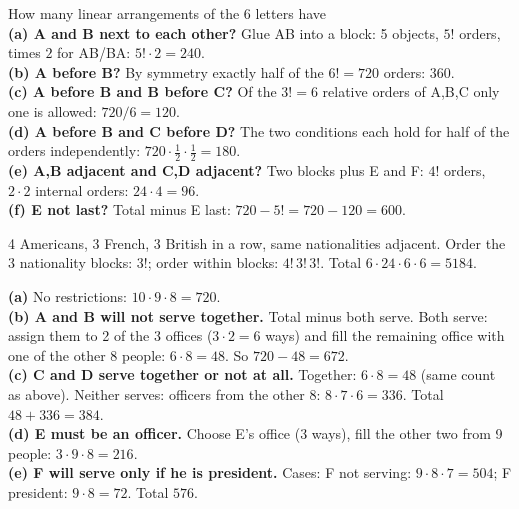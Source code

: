 \documentclass[11pt]{article}
\begin{document}
\begin{exbox}[1.1 Arrangements of A, B, C, D, E, F]
How many linear arrangements of the 6 letters have\\
\textbf{(a) A and B next to each other?} Glue AB into a block: 5 objects, $5!$ orders, times $2$ for AB/BA: $5!\cdot2=\boxed{240}$.\\
\textbf{(b) A before B?} By symmetry exactly half of the $6!=720$ orders: $\boxed{360}$.\\
\textbf{(c) A before B and B before C?} Of the $3!=6$ relative orders of A,B,C only one is allowed: $720/6=\boxed{120}$.\\
\textbf{(d) A before B and C before D?} The two conditions each hold for half of the orders independently: $720\cdot\tfrac12\cdot\tfrac12=\boxed{180}$.\\
\textbf{(e) A,B adjacent and C,D adjacent?} Two blocks plus E and F: $4!$ orders, $2\cdot2$ internal orders: $24\cdot4=\boxed{96}$.\\
\textbf{(f) E not last?} Total minus E last: $720-5!=720-120=\boxed{600}$.
\end{exbox}

\begin{exbox}
4 Americans, 3 French, 3 British in a row, same nationalities adjacent. Order the 3 nationality blocks: $3!$; order within blocks: $4!\,3!\,3!$. Total $6\cdot24\cdot6\cdot6=\boxed{5184}$.
\end{exbox}

\begin{exbox}
\textbf{(a)} No restrictions: $10\cdot9\cdot8=\boxed{720}$.\\
\textbf{(b) A and B will not serve together.} Total minus both serve. Both serve: assign them to 2 of the 3 offices ($3\cdot2=6$ ways) and fill the remaining office with one of the other 8 people: $6\cdot8=48$. So $720-48=\boxed{672}$.\\
\textbf{(c) C and D serve together or not at all.} Together: $6\cdot8=48$ (same count as above). Neither serves: officers from the other 8: $8\cdot7\cdot6=336$. Total $48+336=\boxed{384}$.\\
\textbf{(d) E must be an officer.} Choose E's office (3 ways), fill the other two from 9 people: $3\cdot9\cdot8=\boxed{216}$.\\
\textbf{(e) F will serve only if he is president.} Cases: F not serving: $9\cdot8\cdot7=504$; F president: $9\cdot8=72$. Total $\boxed{576}$.
\end{exbox}
\end{document}
